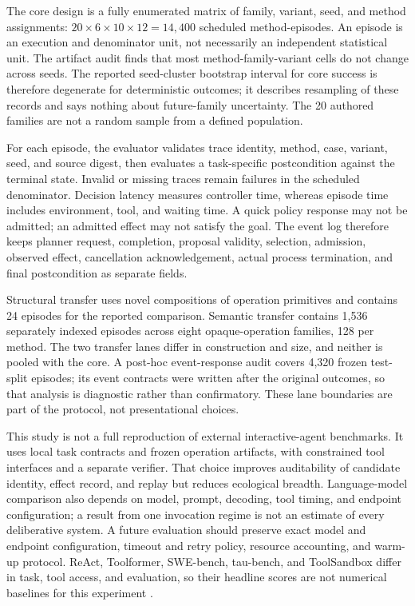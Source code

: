 \documentclass[11pt]{article}
\begin{document}
The core design is a fully enumerated matrix of family, variant, seed, and method assignments: $20\times6\times10\times12=14{,}400$ scheduled method-episodes. An episode is an execution and denominator unit, not necessarily an independent statistical unit. The artifact audit finds that most method-family-variant cells do not change across seeds. The reported seed-cluster bootstrap interval for core success is therefore degenerate for deterministic outcomes; it describes resampling of these records and says nothing about future-family uncertainty. The 20 authored families are not a random sample from a defined population.

For each episode, the evaluator validates trace identity, method, case, variant, seed, and source digest, then evaluates a task-specific postcondition against the terminal state. Invalid or missing traces remain failures in the scheduled denominator. Decision latency measures controller time, whereas episode time includes environment, tool, and waiting time. A quick policy response may not be admitted; an admitted effect may not satisfy the goal. The event log therefore keeps planner request, completion, proposal validity, selection, admission, observed effect, cancellation acknowledgement, actual process termination, and final postcondition as separate fields.

Structural transfer uses novel compositions of operation primitives and contains 24 episodes for the reported comparison. Semantic transfer contains 1,536 separately indexed episodes across eight opaque-operation families, 128 per method. The two transfer lanes differ in construction and size, and neither is pooled with the core. A post-hoc event-response audit covers 4,320 frozen test-split episodes; its event contracts were written after the original outcomes, so that analysis is diagnostic rather than confirmatory. These lane boundaries are part of the protocol, not presentational choices.

This study is not a full reproduction of external interactive-agent benchmarks. It uses local task contracts and frozen operation artifacts, with constrained tool interfaces and a separate verifier. That choice improves auditability of candidate identity, effect record, and replay but reduces ecological breadth. Language-model comparison also depends on model, prompt, decoding, tool timing, and endpoint configuration; a result from one invocation regime is not an estimate of every deliberative system. A future evaluation should preserve exact model and endpoint configuration, timeout and retry policy, resource accounting, and warm-up protocol. ReAct, Toolformer, SWE-bench, tau-bench, and ToolSandbox differ in task, tool access, and evaluation, so their headline scores are not numerical baselines for this experiment \cite{react,toolformer,swebench,taubench,toolsandbox}.
\end{document}

